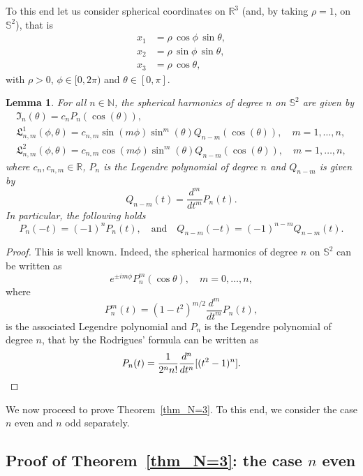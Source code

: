 \documentclass[10pt,reqno,english]{amsart}
\newcommand{\Sd}{\mathbb{S}^2}
\newcommand{\N}{\mathbb{N}}
\newcommand{\R} {\mathbb R}
\newtheorem{lemma}{Lemma}[section]
\theoremstyle{definition}
\numberwithin{equation}{section}
\begin{document}
To this end let us consider spherical coordinates on $\R^3$ (and, by taking $\rho=1$, on $\Sd$), that is
\begin{equation}
\label{sphe-coord}
\begin{aligned}
x_1 &=\rho\, \cos\phi \, \sin\theta, \\
x_2 &=\rho\, \sin\phi \, \sin\theta, \\
x_3 &=\rho\, \cos\theta,
\end{aligned}
\end{equation}
with $\rho>0$, $\phi \in [0,2\pi)$ and $\theta\in [0,\pi]$.

\begin{lemma}
\label{lemma:sphar}
For all $n\in\N$, the spherical harmonics of degree $n$ on $\Sd$ are given by
\begin{gather*}
\mathfrak I_n(\theta)=c_n P_n(\cos(\theta)),\\
\mathfrak L^1_{n,m}(\phi,\theta)=c_{n,m}\sin(m\phi)\sin^m(\theta)Q_{n-m}(\cos(\theta)),\quad m=1,\dots,n,\\
\mathfrak L^2_{n,m}(\phi,\theta)=c_{n,m}\cos(m\phi)\sin^m(\theta)Q_{n-m}(\cos(\theta)),\quad m=1,\dots,n,
\end{gather*}
where $c_n,c_{n,m}\in\R$, $P_{n}$ is the Legendre polynomial of degree $n$ and $Q_{n-m}$ is given by
\[
Q_{n-m}(t)=\frac{d^m}{dt^m}P_n(t).
\]
In particular, the following holds
\[
P_n(-t)=(-1)^nP_n(t),\quad\text{and}\quad Q_{n-m}(-t)=(-1)^{n-m}Q_{n-m}(t).
\]
\end{lemma}
\begin{proof}
This is well known. Indeed, the spherical harmonics of degree $n$ on $\Sd$ can be written as
\[
e^{\pm im\phi}P^m_n(\cos\theta),\quad m=0,\dots,n,
\]
where
\[
P^m_n(t)=(1-t^2)^{m/2}\frac{d^m}{dt^m}P_n(t),
\]
is the associated Legendre polynomial and $P_n$ is the Legendre polynomial of degree $n$, that by the Rodrigues' formula can be written as
\[
P_n(t)=\frac{1}{2^nn!}\frac{d^n}{dt^n}[(t^2-1)^n].\qedhere
\]
\end{proof}


We now proceed to prove Theorem~\ref{thm_N=3}. To this end, we consider the case $n$ even and $n$ odd separately.



\subsection{Proof of Theorem\texorpdfstring{~\ref{thm_N=3}}{ 1}: the case \texorpdfstring{$n$}{n} even}
\end{document}
